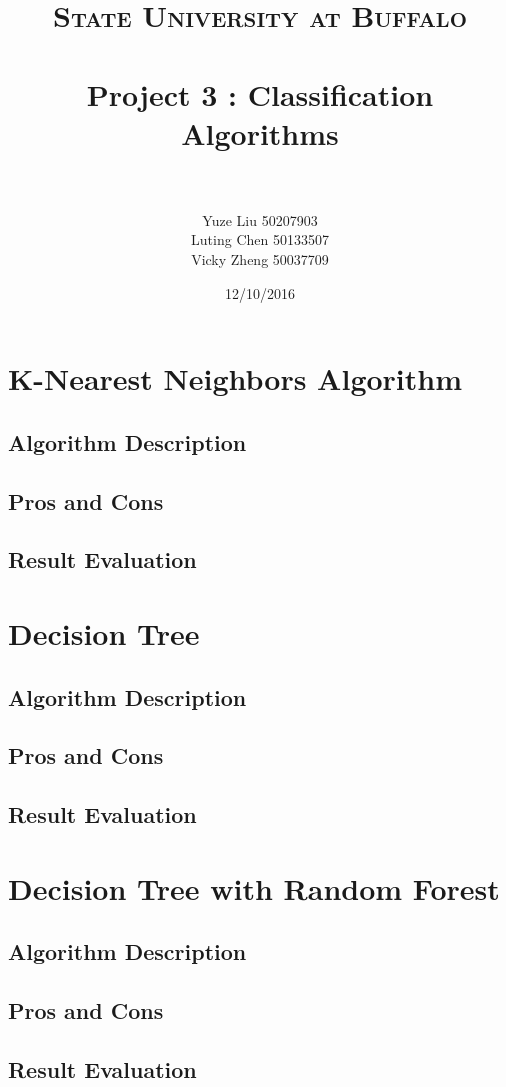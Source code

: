 \documentclass[paper=letter, fontsize=11pt]{article}
\title{
		\usefont{OT1}{bch}{b}{n}
		\normalfont \normalsize \textsc{State University at Buffalo} \\ [25pt]
		\horrule{0.5pt} \\[0.4cm]
		\Large Project 3 : Classification Algorithms \\
		\horrule{2pt} \\[0.5cm]
}
\author{
		\normalfont\large 								
        Yuze Liu \hspace{0.6cm}50207903\\
        \normalfont\large 
        Luting Chen \hspace{0.5cm}50133507\\
        \normalfont\large 
        Vicky Zheng \hspace{0.5cm}50037709\\
}
\date{\large 12/10/2016}
\numberwithin{equation}{section}		%
\numberwithin{figure}{section}			%
\numberwithin{table}{section}				%
\begin{document}
\maketitle
\section{K-Nearest Neighbors Algorithm}
\subsection{Algorithm Description}

\subsection{Pros and Cons}

\subsection{Result Evaluation}

\section{Decision Tree}
\subsection{Algorithm Description}

\subsection{Pros and Cons}

\subsection{Result Evaluation}

\section{Decision Tree with Random Forest}
\subsection{Algorithm Description}
\subsection{Pros and Cons}
\subsection{Result Evaluation}
\end{document}
